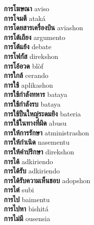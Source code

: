 \textbf{ การโฆษณา  } aviso \\
\textbf{ การโจมตี  } ataká \\
\textbf{ การโดยสารเครื่องบิน  } aviashon \\
\textbf{ การโต้เถียง  } argumento \\
\textbf{ การโต้แย้ง  } debate \\
\textbf{ การโฟกัส  } direkshon \\
\textbf{ การโอ้อวด  } blòf \\
\textbf{ การใกล้  } cerando \\
\textbf{ การใช้  } aplikashon \\
\textbf{ การใช้กำลังทหาร  } bataya \\
\textbf{ การใช้กำลังรบ  } bataya \\
\textbf{ การใช้ปืนใหญ่ระดมยิง  } bateria \\
\textbf{ การใช้ในทางที่ผิด  } abusu \\
\textbf{ การให้การรักษา  } atministrashon \\
\textbf{ การให้กำเนิด  } nasementu \\
\textbf{ การให้คำปรึกษา  } direkshon \\
\textbf{ การได้  } adkiriendo \\
\textbf{ การได้รับ  } adkiriendo \\
\textbf{ การได้รับความเห็นชอบ  } adopshon \\
\textbf{ การไต่  } subi \\
\textbf{ การไป  } baimentu \\
\textbf{ การไปหา  } bishitá \\
\textbf{ การไม่มี  } ousensia \\
